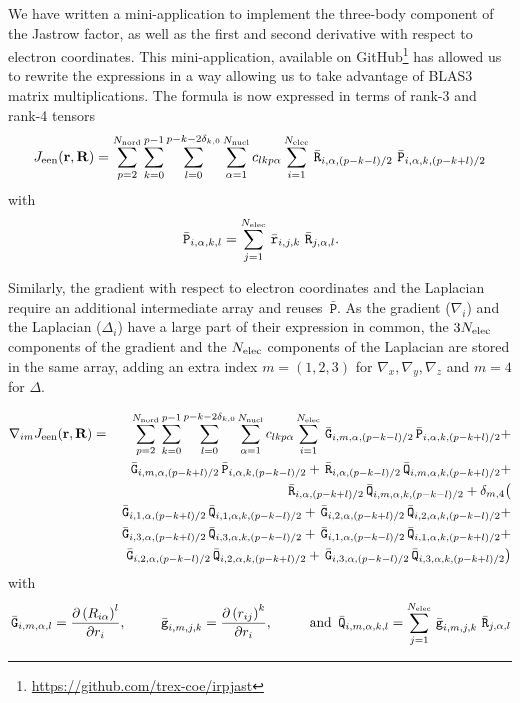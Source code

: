 We have written a mini-application to implement the three-body component
of the Jastrow factor, as well as the first and second derivative with
respect to electron coordinates. This mini-application, available on
GitHub\footnote{\url{https://github.com/trex-coe/irpjast}} has allowed us to
rewrite the expressions in a way allowing us to take advantage of BLAS3
matrix multiplications. The formula is now expressed in terms of
rank-3 and rank-4 tensors
\newcommand{\tr}{\, \bar{\mathtt{r}}}
\newcommand{\tR}{\, \bar{\mathtt{R}}}
\newcommand{\tP}{\, \bar{\mathtt{P}}}
\[
  \Jeen(\br,\bR) = 
  \sum_{p=2}^{\Nord}\sum_{k=0}^{p-1}
  \sum_{l=0}^{\lmax} 
    \sum_{\alpha=1}^{\Nat}
    c_{lkp\alpha}
    \sum_{i=1}^{\Nel}
    {\tR}_{i,\alpha,(p-k-l)/2}\,
  {\tP}_{i,\alpha,k,(p-k+l)/2}
  \]
with 
  \[
  {\tP}_{i, \alpha, k, l} = \sum_{j=1}^{\Nel} {\tr}_{i,j,k}\,{\tR}_{j,\alpha,l}.
  \]
  
Similarly, the gradient with respect to electron coordinates and the
Laplacian require an additional intermediate array and reuses ${\tP}$. As
the gradient ($\nabla_{i}$) and the Laplacian ($\Delta_i$) have a
large part of their expression in common, the $3N_{\text{elec}}$ components of
the gradient and the $N_{\text{elec}}$ components of the Laplacian are stored in
the same array, adding an extra index $m=(1,2,3)$ for $\nabla_x,
\nabla_y,\nabla_z$
and $m=4$ for $\Delta$.

\newcommand{\tg}{\, \bar{\mathtt{g}}}
\newcommand{\tG}{\, \bar{\mathtt{G}}}
\newcommand{\tQ}{\, \bar{\mathtt{Q}}}

\begin{eqnarray*}
  \nabla_{im} \Jeen(\br,\bR) & = &
  \sum_{p=2}^{\Nord}\sum_{k=0}^{p-1}
  \sum_{l=0}^{\lmax} 
    \sum_{\alpha=1}^{\Nat}
    c_{lkp\alpha}
    \sum_{i=1}^{\Nel} 
     {\tG}_{i,m,\alpha,(p-k-l)/2} {\tP}_{i,\alpha,k,(p-k+l)/2} +  \\
&&   {\tG}_{i,m,\alpha,(p-k+l)/2} {\tP}_{i,\alpha,k,(p-k-l)/2} + 
     {\tR}_{i,\alpha,(p-k-l)/2} {\tQ}_{i,m,\alpha,k,(p-k+l)/2} + \\
&&   {\tR}_{i,\alpha,(p-k+l)/2} {\tQ}_{i,m,\alpha,k,(p-k-l)/2} + 
    \delta_{m,4} \big( \\
&&     {\tG}_{i,1,\alpha,(p-k+l)/2} {\tQ}_{i,1,\alpha,k,(p-k-l)/2} +
       {\tG}_{i,2,\alpha,(p-k+l)/2} {\tQ}_{i,2,\alpha,k,(p-k-l)/2} + \\
&&     {\tG}_{i,3,\alpha,(p-k+l)/2} {\tQ}_{i,3,\alpha,k,(p-k-l)/2} +
       {\tG}_{i,1,\alpha,(p-k-l)/2} {\tQ}_{i,1,\alpha,k,(p-k+l)/2} + \\
&&     {\tG}_{i,2,\alpha,(p-k-l)/2} {\tQ}_{i,2,\alpha,k,(p-k+l)/2} + 
       {\tG}_{i,3,\alpha,(p-k-l)/2} {\tQ}_{i,3,\alpha,k,(p-k+l)/2} \big)
\end{eqnarray*}
with 
\[
  {\tG}_{i, m, \alpha, l}  =  \frac{\partial \left( {R}_{i\alpha} \right)^l}
                             {\partial r_i},  \phantom{ space }
  {\tg}_{i, m, j, k}  =  \frac{\partial \left( {r}_{ij} \right)^k}
                             {\partial r_i}, \phantom{ space }
                             \text{ and } 
  {\tQ}_{i, m, \alpha, k, l}  =  \sum_{j=1}^{\Nel}
                            {\tg}_{i,m,j,k}\,{\tR}_{j,\alpha,l} 
\]
  
